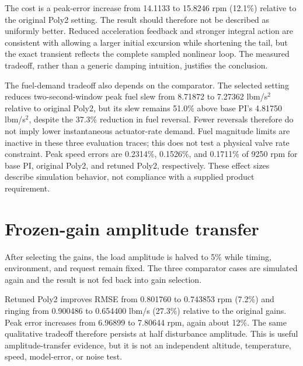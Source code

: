 The cost is a peak-error increase from 14.1133 to 15.8246 rpm (12.1\%) relative to the original Poly2 setting. The result should therefore not be described as uniformly better. Reduced acceleration feedback and stronger integral action are consistent with allowing a larger initial excursion while shortening the tail, but the exact transient reflects the complete sampled nonlinear loop. The measured tradeoff, rather than a generic damping intuition, justifies the conclusion.

The fuel-demand tradeoff also depends on the comparator. The selected setting reduces two-second-window peak fuel slew from 8.71872 to 7.27362 lbm/s$^2$ relative to original Poly2, but its slew remains 51.0\% above base PI's 4.81750 lbm/s$^2$, despite the 37.3\% reduction in fuel reversal. Fewer reversals therefore do not imply lower instantaneous actuator-rate demand. Fuel magnitude limits are inactive in these three evaluation traces; this does not test a physical valve rate constraint. Peak speed errors are 0.2314\%, 0.1526\%, and 0.1711\% of 9250 rpm for base PI, original Poly2, and retuned Poly2, respectively. These effect sizes describe simulation behavior, not compliance with a supplied product requirement.


\section{Frozen-gain amplitude transfer}
After selecting the gains, the load amplitude is halved to 5\% while timing, environment, and request remain fixed. The three comparator cases are simulated again and the result is not fed back into gain selection.

Retuned Poly2 improves RMSE from 0.801760 to 0.743853 rpm (7.2\%) and ringing from 0.900486 to 0.654400 lbm/s (27.3\%) relative to the original gains. Peak error increases from 6.96899 to 7.80644 rpm, again about 12\%. The same qualitative tradeoff therefore persists at half disturbance amplitude. This is useful amplitude-transfer evidence, but it is not an independent altitude, temperature, speed, model-error, or noise test.

